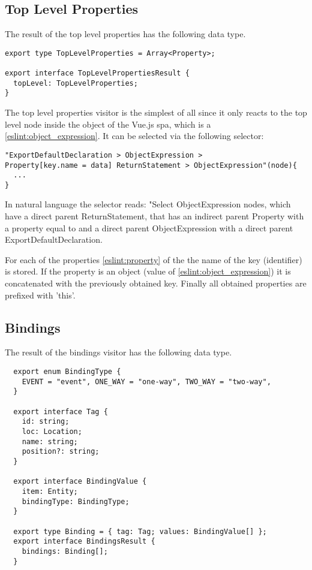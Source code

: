 \subsection{Top Level Properties}
The result of the top level properties has the following data type.
\begin{lstlisting}
export type TopLevelProperties = Array<Property>;

export interface TopLevelPropertiesResult {
  topLevel: TopLevelProperties;
}
\end{lstlisting}

The top level properties visitor is the simplest of all since it only reacts to the top level  node inside the  object  of the Vue.js \gls{spa}, which is a  \ref{eslint:object_expression}. It can be selected via the following selector:

\label{impl:top_level_select}
\begin{lstlisting}
"ExportDefaultDeclaration > ObjectExpression > 
Property[key.name = data] ReturnStatement > ObjectExpression"(node){
  ...
}
\end{lstlisting}
In natural language the selector reads: "Select ObjectExpression nodes, which have a direct parent ReturnStatement, that has an indirect parent Property with a property  equal to  and a direct parent ObjectExpression with a direct parent ExportDefaultDeclaration.

For each of the properties \ref{eslint:property} of the  the name of the key (identifier) is stored. If the property is an object (value of  \ref{eslint:object_expression}) it is concatenated with the previously obtained key. Finally all obtained properties are prefixed with 'this'.

\subsection{Bindings}
The result of the bindings visitor has the following data type.
\begin{lstlisting}
  export enum BindingType {
    EVENT = "event", ONE_WAY = "one-way", TWO_WAY = "two-way",
  }
  
  export interface Tag {
    id: string;
    loc: Location;
    name: string;
    position?: string;
  }
  
  export interface BindingValue {
    item: Entity;
    bindingType: BindingType;
  }
  
  export type Binding = { tag: Tag; values: BindingValue[] };
  export interface BindingsResult {
    bindings: Binding[];
  }
\end{lstlisting}

